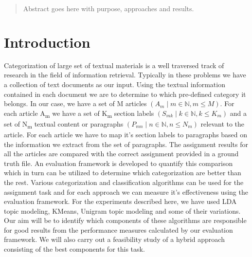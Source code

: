 
\date{Received: date / Accepted: date}


\maketitle

\begin{abstract}
Abstract goes here with purpose, approaches and results.
\end{abstract}

\section{Introduction}
\label{intro}
Categorization of large set of textual materials is a well traversed track of research in the field of information retrieval. Typically in these problems we have a collection of text documents as our input. Using the textual information contained in each document we are to determine to which pre-defined category it belongs. In our case, we have a set of M articles $(A_m \mid m \in \mathbb{N}, m \leq M)$. For each article A\textsubscript{m} we have a set of K\textsubscript{m} section labels 
$(S_{mk} \mid k \in \mathbb{N}, k \leq K_m)$ and a set of N\textsubscript{m} textual content or paragraphs 
$(P_{mn} \mid n \in \mathbb{N}, n \leq N_m)$ relevant to the article. For each article we have to map it's section labels to paragraphs based on the information we extract from the set of paragraphs. The assignment results for all the articles are compared with the correct assignment provided in a ground truth file.
An evaluation framework is developed to quantify this comparison which in turn can be utilized to determine which categorization are better than the rest.
Various categorization and classification algorithms can be used for the assignment task and for each approach we can measure it's effectiveness using the evaluation framework. For the experiments described here, we have used LDA topic modeling, KMeans, Unigram topic modeling and some of their variations. Our aim will be to identify which components of these algorithms are responsible for good results from the performance measures calculated by our evaluation framework. We will also carry out a feasibility study of a hybrid approach consisting of the best components for this task.


